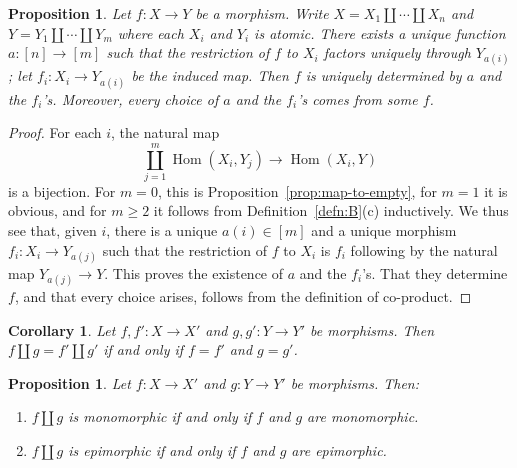 \documentclass[12pt]{amsart}
\numberwithin{equation}{section}
\newtheorem{proposition}[equation]{Proposition}
\newtheorem{corollary}[equation]{Corollary}
\theoremstyle{definition}
\DeclareMathOperator{\Hom}{Hom}
\begin{document}
\begin{proposition} \label{prop:Bmap}
Let $f \colon X \to Y$ be a morphism. Write $X=X_1 \amalg \cdots \amalg X_n$ and $Y=Y_1 \amalg \cdots \amalg Y_m$ where each $X_i$ and $Y_i$ is atomic. There exists a unique function $a \colon [n] \to [m]$ such that the restriction of $f$ to $X_i$ factors uniquely through $Y_{a(i)}$; let $f_i \colon X_i \to Y_{a(i)}$ be the induced map. Then $f$ is uniquely determined by $a$ and the $f_i$'s. Moreover, every choice of $a$ and the $f_i$'s comes from some $f$.
\end{proposition}

\begin{proof}
For each $i$, the natural map
\begin{displaymath}
\coprod_{j=1}^m \Hom(X_i, Y_j) \to \Hom(X_i, Y)
\end{displaymath}
is a bijection. For $m=0$, this is Proposition~\ref{prop:map-to-empty}, for $m=1$ it is obvious, and for $m \ge 2$ it follows from Definition~\ref{defn:B}(c) inductively. We thus see that, given $i$, there is a unique $a(i) \in [m]$ and a unique morphism $f_i \colon X_i \to Y_{a(j)}$ such that the restriction of $f$ to $X_i$ is $f_i$ following by the natural map $Y_{a(j)} \to Y$. This proves the existence of $a$ and the $f_i$'s. That they determine $f$, and that every choice arises, follows from the definition of co-product.
\end{proof}

\begin{corollary} \label{cor:Bmap}
Let $f, f' \colon X \to X'$ and $g, g' \colon Y \to Y'$ be morphisms. Then $f \amalg g=f' \amalg g'$ if and only if $f=f'$ and $g=g'$.
\end{corollary}

\begin{proposition} \label{prop:monic-sum}
Let $f \colon X \to X'$ and $g \colon Y \to Y'$ be morphisms. Then:
\begin{enumerate}
\item $f \amalg g$ is monomorphic if and only if $f$ and $g$ are monomorphic.
\item $f \amalg g$ is epimorphic if and only if $f$ and $g$ are epimorphic.
\end{enumerate}
\end{proposition}
\end{document}
